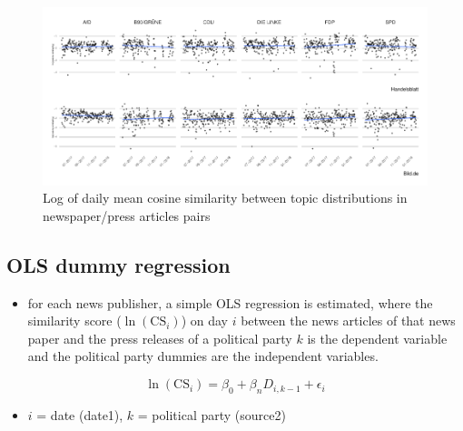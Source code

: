 \documentclass[
]{article}
\providecommand{\tightlist}{%
  \setlength{\itemsep}{0pt}\setlength{\parskip}{0pt}}
\begin{document}
\begin{figure}

{\centering \includegraphics[width=0.8\linewidth]{main_text_files/figure-latex/Daily mean cosine similarity-1} 

}

\caption{Log of daily mean cosine similarity between topic distributions in newspaper/press articles pairs \label{fig:mean_cosine_sim_ols}}\label{fig:Daily mean cosine similarity}
\end{figure}

\hypertarget{ols-dummy-regression}{%
\subsection{OLS dummy regression}\label{ols-dummy-regression}}

\begin{itemize}
\tightlist
\item
  for each news publisher, a simple OLS regression is estimated, where
  the similarity score (\(\ln(\text{CS}_{i})\)) on day \(i\) between the
  news articles of that news paper and the press releases of a political
  party \(k\) is the dependent variable and the political party dummies
  are the independent variables.
\end{itemize}

\[
\ln(\text{CS}_{i})=\beta_0+\beta_nD_{i,k-1}+\epsilon_i
\]

\begin{itemize}
\tightlist
\item
  \(i\) = date (date1), \(k\) = political party (source2)
\end{itemize}
\end{document}
